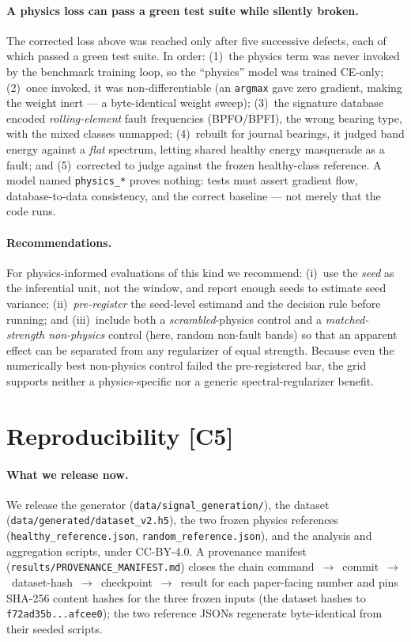 \documentclass{article}
\newcommand{\code}[1]{\nolinkurl{#1}}
\begin{document}
\paragraph{A physics loss can pass a green test suite while silently broken.}
The corrected loss above was reached only after five successive defects, each of
which passed a green test suite. In order: (1)~the physics term was never
invoked by the benchmark training loop, so the ``physics'' model was trained
CE-only; (2)~once invoked, it was non-differentiable (an \texttt{argmax} gave
zero gradient, making the weight inert --- a byte-identical weight sweep);
(3)~the signature database encoded \emph{rolling-element} fault frequencies
(BPFO/BPFI), the wrong bearing type, with the mixed classes unmapped;
(4)~rebuilt for journal bearings, it judged band energy against a \emph{flat}
spectrum, letting shared healthy energy masquerade as a fault; and
(5)~corrected to judge against the frozen healthy-class reference. A model named
\texttt{physics\_*} proves nothing: tests must assert gradient flow,
database-to-data consistency, and the correct baseline --- not merely that the
code runs.

\paragraph{Recommendations.}
For physics-informed evaluations of this kind we recommend: (i)~use the
\emph{seed} as the inferential unit, not the window, and report enough seeds to
estimate seed variance; (ii)~\emph{pre-register} the seed-level estimand and the
decision rule before running; and (iii)~include both a \emph{scrambled}-physics
control and a \emph{matched-strength non-physics} control (here, random
non-fault bands) so that an apparent effect can be separated from any
regularizer of equal strength. Because even the numerically best non-physics
control failed the pre-registered bar, the grid supports neither a
physics-specific nor a generic spectral-regularizer benefit.

\section{Reproducibility [C5]}
\label{sec:repro}
\paragraph{What we release now.}
We release the generator (\code{data/signal_generation/}), the dataset
(\code{data/generated/dataset_v2.h5}), the two frozen physics references
(\code{healthy_reference.json}, \code{random_reference.json}), and the analysis
and aggregation scripts, under CC-BY-4.0. A provenance manifest
(\code{results/PROVENANCE_MANIFEST.md}) closes the chain
command~$\rightarrow$~commit~$\rightarrow$~dataset-hash~$\rightarrow$~checkpoint~$\rightarrow$~result
for each paper-facing number and pins SHA-256 content hashes for the three frozen
inputs (the dataset hashes to \code{f72ad35b...afcee0}); the two reference JSONs
regenerate byte-identical from their seeded scripts.
\end{document}
